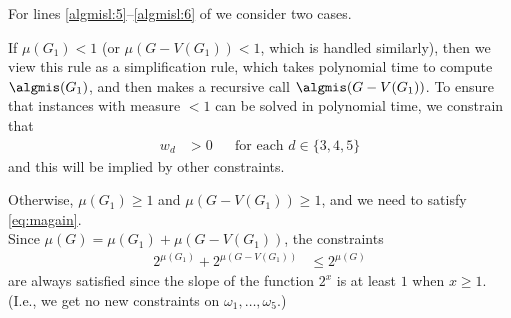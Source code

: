 \begin{frame}
	
 For lines \ref{algmisl:5}--\ref{algmisl:6} of \algmis we consider two cases.
 
 If $\mu(G_1) < 1$ (or $\mu(G-V(G_1)) < 1$, which is handled similarly), then
 we view this rule as a simplification rule, which takes polynomial time to compute $\text{\algmis}(G_1)$,
 and then makes a recursive call $\text{\algmis}(G - V(G_1))$. To ensure that instances
 with measure $< 1$ can be solved in polynomial time, we constrain that
 \begin{align*}
	w_d &>  0 && \text{for each }d\in\{3,4,5\}
 \end{align*}
 and this will be implied by other constraints.
 
 Otherwise, $\mu(G_1)\ge 1$ and $\mu(G-V(G_1))\ge 1$, and we need to satisfy \eqref{eq:magain}.\\
 Since $\mu(G)=\mu(G_1)+\mu(G-V(G_1))$, the constraints
 \begin{align*}
 2^{\mu(G_1)}+2^{\mu(G-V(G_1))} &\le 2^{\mu(G)}
 \end{align*}
 are always satisfied since the slope of the function $2^x$ is at least $1$ when $x\ge 1$.\\
 (I.e., we get no new constraints on $\omega_1, \dots,\omega_5$.)
 
\end{frame}



